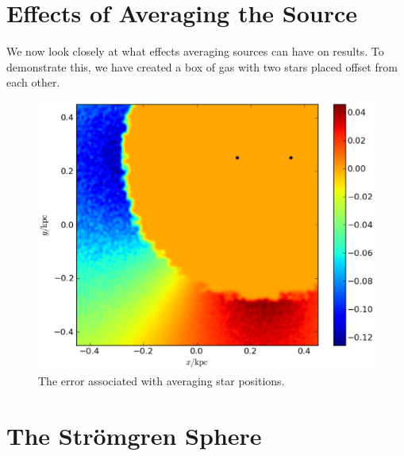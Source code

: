 \section{Effects of Averaging the Source}
\label{sec:averagingsource}

We now look closely at what effects averaging sources can have on results. To demonstrate this, we have created a box of gas with two stars placed offset from each other.


\begin{figure}
\includegraphics[width=\textwidth]{graphics/errorMap2starthick.eps}
\caption[The error associated with averaging star positions.]{The error associated with averaging star positions.}
\label{fig:twostar}
\end{figure}


%

\section{The Str\"omgren Sphere}
\label{sec:stromgren}

